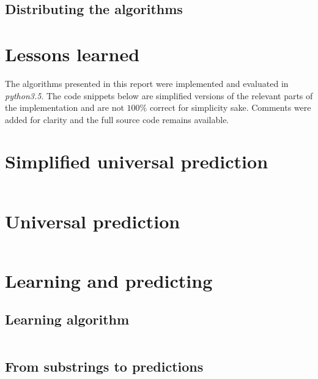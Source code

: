 \documentclass[a4paper,12pt]{article}
\begin{document}
  \subsection{Distributing the algorithms}

\section*{Lessons learned}

  \lipsum[8-9]

\clearpage
\begin{appendices}

  The algorithms presented in this report were implemented and evaluated
  in \emph{python3.5}. The code snippets below are simplified versions of
  the relevant parts of the implementation and are not $100\%$ correct for
  simplicity sake. Comments were added for clarity and the full source code
  remains available.

  \section{Simplified universal prediction}

    \inputminted[linenos]{python}{code/simplified.py}

  \clearpage
  \section{Universal prediction}

    \inputminted[linenos]{python}{code/complete.py}

  \clearpage
  \section{Learning and predicting}

    \subsection{Learning algorithm}

      \inputminted[linenos]{python}{code/learning.py}

    \clearpage
    \subsection{From substrings to predictions}

      \inputminted[linenos]{python}{code/predicting.py}

\end{appendices}


 
\end{document}
